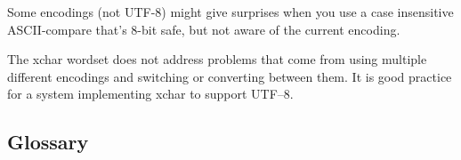 Some encodings (not UTF-8) might give surprises when you use a case
insensitive ASCII-compare that's 8-bit safe, but not aware of the
current encoding.

The xchar wordset does not address problems that come from using
multiple different encodings and switching or converting between them.
It is good practice for a system implementing xchar to support UTF--8.

\setcounter{subsection}{5}
\subsection{Glossary} %


\endinput
